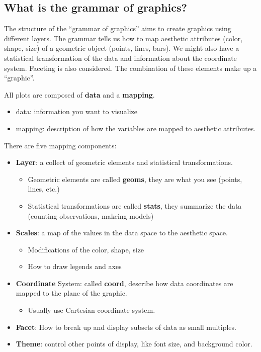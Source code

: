 \documentclass[
]{book}
\providecommand{\tightlist}{%
  \setlength{\itemsep}{0pt}\setlength{\parskip}{0pt}}
\begin{document}
\hypertarget{what-is-the-grammar-of-graphics}{%
\subsection*{What is the grammar of graphics?}\label{what-is-the-grammar-of-graphics}}

The structure of the ``grammar of graphics'' aims to create graphics using different layers. The grammar tells us how to map aesthetic attributes (color, shape, size) of a geometric object (points, lines, bars). We might also have a statistical transformation of the data and information about the coordinate system. Faceting is also considered. The combination of these elements make up a ``graphic''.

All plots are composed of \textbf{data} and a \textbf{mapping}.

\begin{itemize}
\item
  data: information you want to visualize
\item
  mapping: description of how the variables are mapped to aesthetic attributes.
\end{itemize}

There are five mapping components:

\begin{itemize}
\item
  \textbf{Layer}: a collect of geometric elements and statistical transformations.

  \begin{itemize}
  \item
    Geometric elements are called \textbf{geoms}, they are what you see (points, lines, etc.)
  \item
    Statistical transformations are called \textbf{stats}, they summarize the data (counting observations, makeing models)
  \end{itemize}
\item
  \textbf{Scales}: a map of the values in the data space to the aesthetic space.

  \begin{itemize}
  \item
    Modifications of the color, shape, size
  \item
    How to draw legends and axes
  \end{itemize}
\item
  \textbf{Coordinate} System: called \textbf{coord}, describe how data coordinates are mapped to the plane of the graphic.

  \begin{itemize}
  \tightlist
  \item
    Usually use Cartesian coordinate system.
  \end{itemize}
\item
  \textbf{Facet}: How to break up and display subsets of data as small multiples.
\item
  \textbf{Theme}: control other points of display, like font size, and background color.
\end{itemize}
\end{document}
